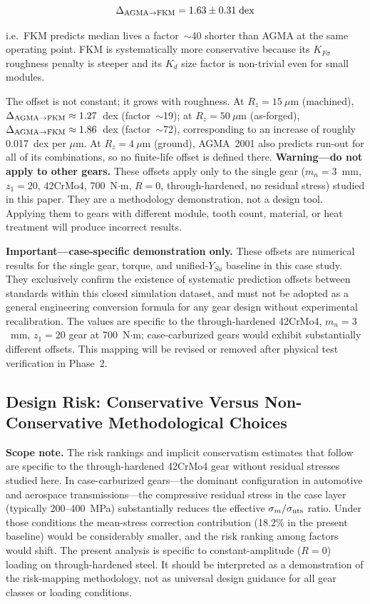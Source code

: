 \documentclass[twocolumn,12pt,a4paper]{article}
\begin{document}
\begin{equation}
\Delta_{\rm AGMA\to FKM} = 1.63 \pm 0.31\;\text{dex}
\label{eq:offsets}
\end{equation}

i.e.\ FKM predicts median lives a factor~$\sim$40 shorter than AGMA
at the same operating point. FKM is systematically more conservative
because its $K_{F\sigma}$ roughness penalty is steeper and its $K_d$
size factor is non-trivial even for small modules.

The offset is not constant; it grows with roughness. At
$R_z=15~\mu$m (machined), $\Delta_{\rm AGMA\to FKM} \approx
1.27$~dex (factor~$\sim$19); at $R_z=50~\mu$m (as-forged),
$\Delta_{\rm AGMA\to FKM} \approx 1.86$~dex (factor~$\sim$72),
corresponding to an increase of roughly 0.017~dex per $\mu$m. At
$R_z=4~\mu$m (ground), AGMA~2001 also predicts run-out for all of its
combinations, so no finite-life offset is defined there.
\textbf{Warning---do not apply to other gears.} These offsets apply
only to the single gear ($m_n=3$~mm, $z_1=20$, 42CrMo4,
700~N$\cdot$m, $R=0$, through-hardened, no residual stress) studied in
this paper. They are a methodology demonstration, not a design tool.
Applying them to gears with different module, tooth count, material,
or heat treatment will produce incorrect results.

\textbf{Important---case-specific demonstration only.}
These offsets are numerical results for the single gear, torque, and
unified-$Y_{Sa}$ baseline in this case study. They exclusively
confirm the existence of systematic prediction offsets between
standards within this closed simulation dataset, and must not be
adopted as a general engineering conversion formula for any gear
design without experimental recalibration. The values are specific to
the through-hardened 42CrMo4, $m_n=3$~mm, $z_1=20$ gear at
700~N$\cdot$m; case-carburized gears would exhibit substantially
different offsets. This mapping will be revised or removed after
physical test verification in Phase~2.

\subsection{Design Risk: Conservative Versus Non-Conservative Methodological Choices}

\textbf{Scope note.} The risk rankings and implicit conservatism
estimates that follow are specific to the through-hardened 42CrMo4
gear without residual stresses studied here. In case-carburized
gears---the dominant configuration in automotive and aerospace
transmissions---the compressive residual stress in the case layer
(typically 200--400~MPa) substantially reduces the effective
$\sigma_m/\sigma_{\rm uts}$ ratio. Under those conditions the
mean-stress correction contribution (18.2\% in the present baseline) would be
considerably smaller, and the risk ranking among factors would shift.
The present analysis is specific to constant-amplitude ($R=0$)
loading on through-hardened steel. It should be interpreted as a
demonstration of the risk-mapping methodology, not as universal
design guidance for all gear classes or loading conditions.
\end{document}
